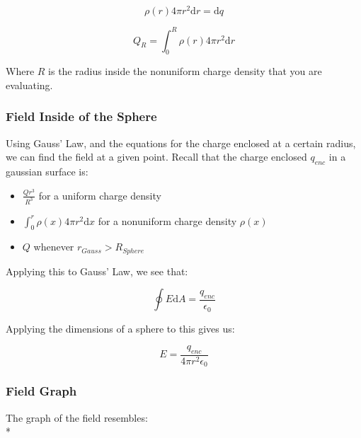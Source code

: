 \documentclass[a4paper,12pt]{article}
\begin{document}
								\begin{equation*}
										\rho(r) 4 \pi r^{2} \mathrm{d}r = \mathrm{d}q
								\end{equation*}

								\begin{equation*}
										Q_{R} = \int_{0}^{R} \rho(r) 4 \pi r^{2} \mathrm{d}r 
								\end{equation*}

								Where $R$ is the radius inside the nonuniform charge density that you are evaluating.
						\subsubsection{Field Inside of the Sphere}
								Using Gauss' Law, and the equations for the charge enclosed at a certain radius, we can find the field at a given point. Recall that the charge enclosed $q_{enc}$ in a gaussian surface is:
								\begin{itemize}
										\item $\frac{Qr^{3}}{R^{3}}$ for a uniform charge density
										\item $\int_{0}^{r} \rho(x) 4 \pi r^{2} \mathrm{d}x$ for a nonuniform charge density $\rho(x)$ 
										\item $Q$ whenever $r_{Gauss} > R_{Sphere}$
								\end{itemize}

								Applying this to Gauss' Law, we see that:

								\begin{equation*}
										\oint E \mathrm{d}A = \frac{q_{enc}}{\epsilon_{0}}
								\end{equation*}

								Applying the dimensions of a sphere to this gives us:

								\begin{equation*}
										E = \frac{q_{enc}}{4 \pi r^{2} \epsilon_{0}}
								\end{equation*}
						\subsubsection{Field Graph}
								The graph of the field resembles:\\*
				\setcounter{subsubsection}{0}
\end{document}
